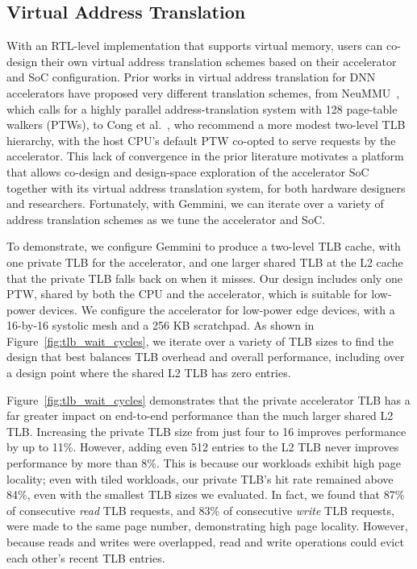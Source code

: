 \subsection{Virtual Address Translation}
\label{virtual-memory-case-study}

With an RTL-level implementation that supports virtual memory, users can co-design their own virtual address translation schemes based on their accelerator and SoC configuration. Prior works in virtual address translation for DNN accelerators have proposed very different translation schemes, from NeuMMU~\cite{neummu-asplos2020}, which calls for a highly parallel address-translation system with 128 page-table walkers (PTWs), to Cong et al.~\cite{address-trans-cong-hpca2017}, who recommend a more modest two-level TLB hierarchy, with the host CPU's default PTW co-opted to serve requests by the accelerator. This lack of convergence in the prior literature motivates a platform that allows co-design and design-space exploration of the accelerator SoC together with its virtual address translation system, for both hardware designers and researchers. Fortunately, with Gemmini, we can iterate over a variety of address translation schemes as we tune the accelerator and SoC.

To demonstrate, we configure Gemmini to produce a two-level TLB cache, with one private TLB for the accelerator, and one larger shared TLB at the L2 cache that the private TLB falls back on when it misses. Our design includes only one PTW, shared by both the CPU and the accelerator, which is suitable for low-power devices. We configure the accelerator for low-power edge devices, with a 16-by-16 systolic mesh and a 256 KB scratchpad. As shown in Figure~\ref{fig:tlb_wait_cycles}, we iterate over a variety of TLB sizes to find the design that best balances TLB overhead and overall performance, including over a design point where the shared L2 TLB has zero entries.

Figure~\ref{fig:tlb_wait_cycles} demonstrates that the private accelerator TLB has a far greater impact on end-to-end performance than the much larger shared L2 TLB. Increasing the private TLB size from just four to 16 improves performance by up to 11\%. However, adding even 512 entries to the L2 TLB never improves performance by more than 8\%. This is because our workloads exhibit high page locality; even with tiled workloads, our private TLB's hit rate remained above 84\%, even with the smallest TLB sizes we evaluated. In fact, we found that 87\% of consecutive \textit{read} TLB requests, and 83\% of consecutive \textit{write} TLB requests, were made to the same page number, demonstrating high page locality. However, because reads and writes were overlapped, read and write operations could evict each other's recent TLB entries.

